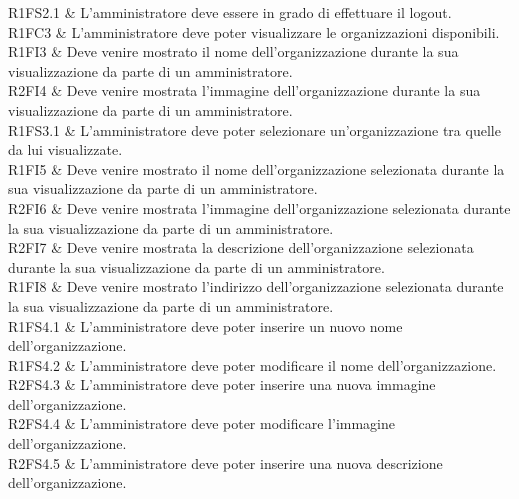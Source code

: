 R1FS2.1 & L'amministratore deve essere in grado di effettuare il logout.\\

R1FC3 & L'amministratore deve poter visualizzare le organizzazioni disponibili.\\

R1FI3 & Deve venire mostrato il nome dell'organizzazione durante la sua visualizzazione da parte di un amministratore. \\

R2FI4 & Deve venire mostrata l'immagine dell'organizzazione durante la sua visualizzazione da parte di un amministratore. \\

R1FS3.1 & L'amministratore deve poter selezionare un'organizzazione tra quelle da lui visualizzate. \\

R1FI5 & Deve venire mostrato il nome dell'organizzazione selezionata durante la sua visualizzazione da parte di un amministratore.\\

R2FI6 & Deve venire mostrata l'immagine dell'organizzazione selezionata durante la sua visualizzazione da parte di un amministratore. \\

R2FI7 & Deve venire mostrata la descrizione dell'organizzazione selezionata durante la sua visualizzazione da parte di un amministratore.\\

R1FI8 & Deve venire mostrato l'indirizzo dell'organizzazione selezionata durante la sua visualizzazione da parte di un amministratore. \\

R1FS4.1 & L'amministratore deve poter inserire un nuovo nome dell'organizzazione.\\

R1FS4.2 & L'amministratore deve poter modificare il nome dell'organizzazione.\\

R2FS4.3 & L'amministratore deve poter inserire una nuova immagine dell'organizzazione.\\

R2FS4.4 & L'amministratore deve poter modificare l'immagine dell'organizzazione.\\

R2FS4.5 & L'amministratore deve poter inserire una nuova descrizione dell'organizzazione. \\

